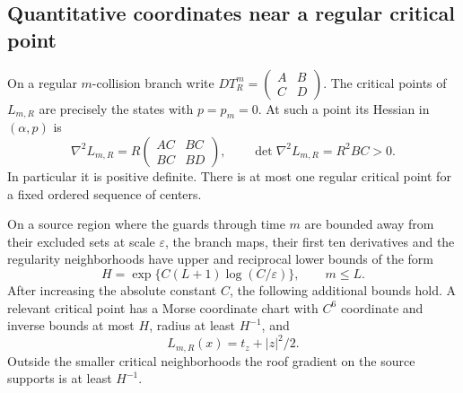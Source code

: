\subsection{Quantitative coordinates near a regular critical point}
\begin{lemma}
\label{lem:v42-critical-coordinates}
On a regular $m$-collision branch write
$DT_R^m=\left(\begin{smallmatrix}A&B\\ C&D\end{smallmatrix}\right)$.
The critical points of $L_{m,R}$ are precisely the states with
$p=p_m=0$. At such a point its Hessian in $(\alpha,p)$ is
\begin{equation}\label{eq:v42-critical-hessian}
 \nabla^2L_{m,R}
   =R\begin{pmatrix}AC&BC\\BC&BD\end{pmatrix},\qquad
 \det\nabla^2L_{m,R}=R^2BC>0.
\end{equation}
In particular it is positive definite. There is at most one regular
critical point for a fixed ordered sequence of centers.

On a source region where the guards through time $m$ are bounded away
from their excluded sets at scale $\varepsilon$, the branch maps,
their first ten derivatives and the regularity neighborhoods have upper
and reciprocal lower bounds of the form
\begin{equation}\label{eq:v42-regularity-budget}
 H=\exp\{C(L+1)\log(C/\varepsilon)\},\qquad m\le L.
\end{equation}
After increasing the absolute constant $C$, the following additional
bounds hold. A relevant critical point has a Morse coordinate chart
with $C^6$ coordinate and inverse bounds at most $H$, radius at least
$H^{-1}$, and
\[
 L_{m,R}(x)=t_z+|z|^2/2.
\]
Outside the smaller critical neighborhoods the roof gradient on the
source supports is at least $H^{-1}$.
\end{lemma}
